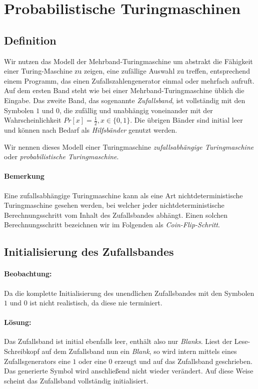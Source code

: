 \section{Probabilistische Turingmaschinen}
\subsection{Definition}
Wir nutzen das Modell der Mehrband-Turingmaschine um abstrakt die Fähigkeit einer Turing-Maschine zu zeigen, eine zufällige Auswahl zu treffen, entsprechend einem Programm, das einen Zufallszahlengenerator einmal oder mehrfach aufruft.
Auf dem ersten Band steht wie bei einer Mehrband-Turingmaschine üblich die Eingabe.
Das zweite Band, das sogenannte \emph{Zufallsband}, ist vollständig mit den Symbolen $1$ und $0$, die zufällig und unabhängig voneinander mit der Wahrscheinlichkeit $Pr[x] = \frac{1}{2}, x \in \{0, 1\}$.
Die übrigen Bänder sind initial leer und können nach Bedarf als \emph{Hilfsbänder} genutzt werden.


Wir nennen dieses Modell einer Turingmaschine \emph{zufallsabhängige Turingmaschine} oder \emph{probabilistische Turingmaschine}.

\paragraph{Bemerkung}
Eine zufallsabhängige Turingmaschine kann als eine Art nichtdeterministische Turingmaschine gesehen werden, bei welcher jeder nichtdeterministische Berechnungsschritt vom Inhalt des Zufallsbandes abhängt.
Einen solchen Berechnungsschritt bezeichnen wir im Folgenden als \emph{Coin-Flip-Schritt}.


\subsection{Initialisierung des Zufallsbandes}
\paragraph{Beobachtung:}
Da die komplette Initialisierung des unendlichen Zufallsbandes mit den Symbolen $1$ und $0$ ist nicht realistisch, da diese nie terminiert.

\paragraph{Lösung:}
Das Zufallsband ist initial ebenfalls leer, enthält also nur \emph{Blanks}. 
Liest der Lese-Schreibkopf auf dem Zufallsband nun ein \emph{Blank}, so wird intern mittels eines Zufallsgenerators eine $1$ oder eine $0$ erzeugt und auf das Zufallsband geschrieben.
Das generierte Symbol wird anschließend nicht wieder verändert.
Auf diese Weise scheint das Zufallsband vollständig initialisiert.


